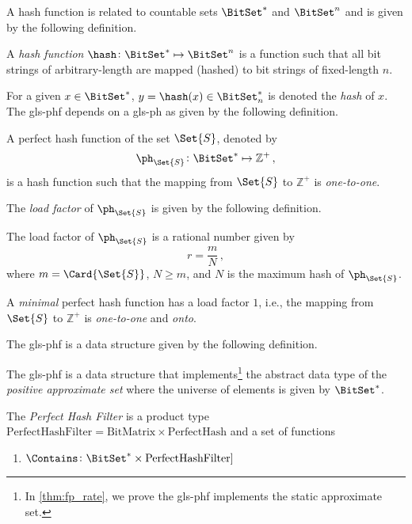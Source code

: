 \documentclass[ ../main.tex]{subfiles}
\begin{document}
A hash function is related to countable sets $\BitSet^*$ and $\BitSet^n$ and is given by the following definition.
\begin{definition}
A \emph{hash function} $\hash \colon \BitSet^* \mapsto \BitSet^n$ is a function such that all bit strings of arbitrary-length are mapped (hashed) to bit strings of fixed-length $n$.
\end{definition}
For a given $x \in \BitSet^*$, $y = \hash(x) \in \BitSet^*_n$ is denoted the \emph{hash} of $x$. The \gls{gls-phf} depends on a \gls{gls-ph} as given by the following definition.
\begin{definition}
A perfect hash function of the set $\Set{S}$, denoted by
\begin{equation}
    \ph_{\Set{S}} \colon \BitSet^* \mapsto \mathbb{Z}^{+}\,,
\end{equation}
is a hash function such that the mapping from $\Set{S}$ to $\mathbb{Z}^+$ is \emph{one-to-one}.
\end{definition}
The \emph{load factor} of $\ph_{\Set{S}}$ is given by the following definition.
\begin{definition}
\label{def:loadfactor}
The load factor of $\ph_{\Set{S}}$ is a rational number given by
\begin{equation}
\label{eq:loadfactor}
    r = \frac{m}{N}\,,
\end{equation}
where $m = \Card{\Set{S}}$, $N \geq m$, and $N$ is the maximum hash of $\ph_{\Set{S}}$.
\end{definition}
\begin{definition}
A \emph{minimal} perfect hash function has a load factor $1$, i.e., the mapping from $\Set{S}$ to $\mathbb{Z}^+$ is \emph{one-to-one} and \emph{onto}.
\end{definition}

The \gls{gls-phf} is a data structure given by the following definition.
\begin{definition}
The \gls{gls-phf} is a data structure that implements\footnote{In \cref{thm:fp_rate}, we prove the \gls{gls-phf} implements the static approximate set.} the abstract data type of the \emph{positive approximate set} where the universe of elements is given by $\BitSet^*$.
\end{definition}


The \emph{Perfect Hash Filter} is a product type $\textrm{PerfectHashFilter} = \textrm{BitMatrix} \times \textrm{PerfectHash}$ and a set of functions
\begin{enumerate}
\item $\Contains \colon \BitSet^* \times \textrm{PerfectHashFilter}]$
\end{enumerate}
\end{document}
